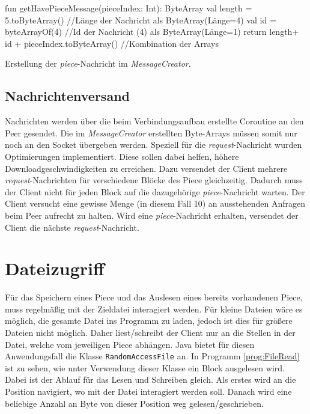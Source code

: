 \begin{program}
    \begin{GenericCode}[numbers=none]
fun getHavePieceMessage(pieceIndex: Int): ByteArray {
    val length = 5.toByteArray() //Länge der Nachricht als ByteArray(Länge=4)
    val id = byteArrayOf(4)      //Id der Nachricht (4) als ByteArray(Länge=1)
    return length+ id + pieceIndex.toByteArray() //Kombination der Arrays
}
    \end{GenericCode}
    \caption{Erstellung der \emph{piece}-Nachricht im \emph{MessageCreator}.}
    \label{prog:MessageCreate}
    \end{program}


\subsection{Nachrichtenversand}

Nachrichten werden über die beim Verbindungsaufbau erstellte Coroutine an den Peer gesendet. Die im \emph{MessageCreator} erstellten Byte-Arrays müssen somit nur noch an den Socket übergeben werden.
Speziell für die \emph{request}-Nachricht wurden Optimierungen implementiert. Diese sollen dabei helfen, höhere Downloadgeschwindigkeiten zu erreichen. Dazu versendet der Client mehrere \emph{request}-Nachrichten für verschiedene Blöcke des Piece gleichzeitig. Dadurch muss der Client nicht für jeden Block auf die dazugehörige \emph{piece}-Nachricht warten. Der Client versucht eine gewisse Menge (in diesem Fall 10) an ausstehenden Anfragen beim Peer aufrecht zu halten. Wird eine \emph{piece}-Nachricht erhalten, versendet der Client die nächste \emph{request}-Nachricht.

\section{Dateizugriff}

Für das Speichern eines Piece und das Auslesen eines bereits vorhandenen Piece, muss regelmäßig mit der Zieldatei interagiert werden. Für kleine Dateien wäre es möglich, die gesamte Datei ins Programm zu laden, jedoch ist dies für größere Dateien nicht möglich. Daher liest/schreibt der Client nur an die Stellen in der Datei, welche vom jeweiligen Piece abhängen. Java bietet für diesen Anwendungsfall die Klasse \verb|RandomAccessFile| an. In Programm \ref{prog:FileRead} ist zu sehen, wie unter Verwendung dieser Klasse ein Block ausgelesen wird. Dabei ist der Ablauf für das Lesen und Schreiben gleich. Als erstes wird an die Position navigiert, wo mit der Datei interagiert werden soll. Danach wird eine beliebige Anzahl an Byte von dieser Position weg gelesen/geschrieben.




